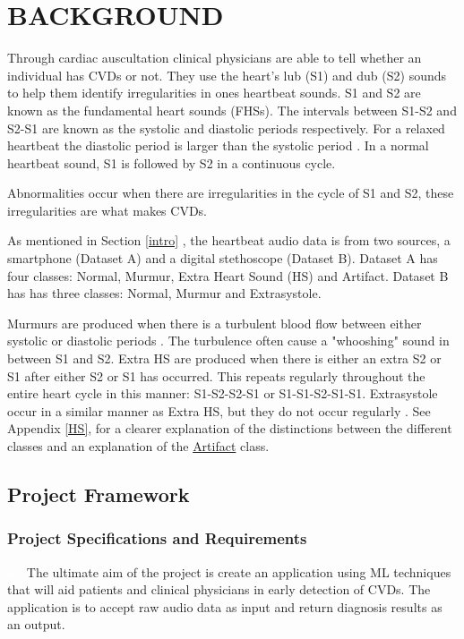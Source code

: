 \documentclass[10pt,twocolumn]{witseiepaper}
\begin{document}

\section{BACKGROUND}
\label{back}
Through cardiac auscultation clinical physicians are able to tell whether an individual has CVDs or not. They use the heart's lub (S1) and dub (S2) sounds to help them identify irregularities in ones heartbeat sounds. S1 and S2 are known as the fundamental heart sounds (FHSs). The intervals between S1-S2 and S2-S1 are known as the systolic and diastolic periods respectively. For a relaxed heartbeat the diastolic period is larger than the systolic period \cite{orient2010sapira}. In a normal heartbeat sound, S1 is followed by S2 in a continuous cycle.

Abnormalities occur when there are irregularities in the cycle of S1 and S2, these irregularities are what makes CVDs. 

As mentioned in Section \ref{intro} , the heartbeat audio data is from two sources, a smartphone (Dataset A) and a digital stethoscope (Dataset B). Dataset A has four classes: Normal, Murmur, Extra Heart Sound (HS) and Artifact. Dataset B has has three classes: Normal, Murmur and Extrasystole. 

Murmurs are produced when there is a turbulent blood flow between either systolic or diastolic periods \cite{35}. The turbulence often cause a "whooshing" sound in between S1 and S2. Extra HS are produced when there is either an extra S2 or S1 after either S2 or S1 has occurred. This repeats regularly throughout the entire heart cycle in this manner: S1-S2-S2-S1 or S1-S1-S2-S1-S1. Extrasystole occur in a similar manner as Extra HS, but they do not occur regularly \cite{bentley}. See Appendix \ref{HS}, for a clearer explanation of the distinctions between the different classes and an explanation of the \hyperref[sec:arti]{Artifact} class.

\subsection{Project Framework}
\subsubsection{Project Specifications and Requirements}
\label{sec:req}
\textcolor{white}{Ke} %
The ultimate aim of the project is create an application using ML techniques that will aid patients and clinical physicians in early detection of CVDs. The application is to accept raw audio data as input and return diagnosis results as an output.
\end{document}

